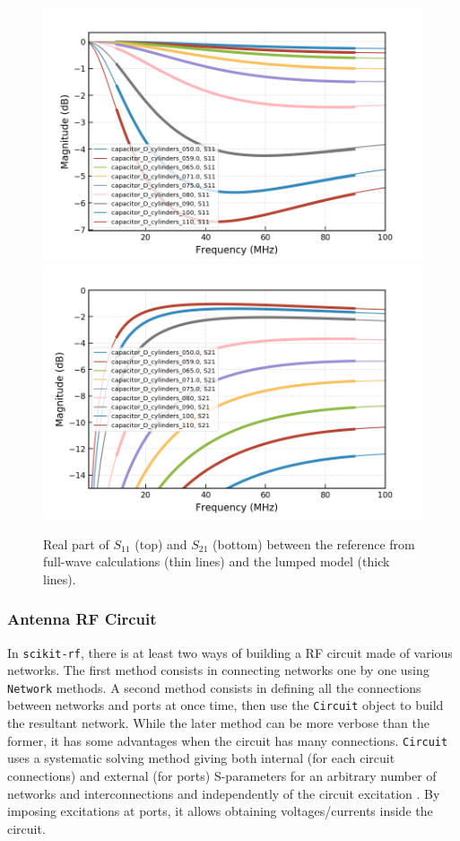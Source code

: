 \begin{figure}
	\centering
	\includegraphics[width=1.0\linewidth]{figures/chap3/WEST_ICRH/comparison_fullwave_lumped_S11}
	\includegraphics[width=1.0\linewidth]{figures/chap3/WEST_ICRH/comparison_fullwave_lumped_S21}
	\caption{Real part of  $S_{11}$ (top) and $S_{21}$ (bottom) between the reference from full-wave  calculations (thin lines) and the lumped model (thick lines).}
	\label{fig:capacitor_interpolation}
\end{figure}

\clearpage
\subsubsection{Antenna RF Circuit}
In \texttt{scikit-rf}, there is at least two ways of building a RF circuit made of various networks. The first method consists in connecting networks one by one using \texttt{Network} methods. A second method consists in defining all the connections between networks and ports at once time, then use the \texttt{Circuit} object to build the resultant network. While the later method can be more verbose than the former, it has some advantages when the circuit has many connections. \texttt{Circuit} uses a systematic solving method giving both internal (for each circuit connections) and external (for ports) S-parameters for an arbitrary number of networks and interconnections and independently of the circuit excitation . By imposing excitations at ports, it allows obtaining voltages/currents inside the circuit.

